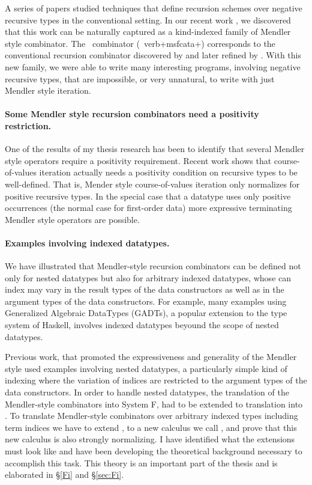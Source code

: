 A series of papers \cite{Pat93,MeiHut95,FegShe96,DesPfeSch97,bgb} studied 
techniques that define recursion schemes over negative recursive types
in the conventional setting. In our recent work \cite{AhnShe11}, we discovered
that this work can be naturally captured as a kind-indexed family of
Mendler style combinator. The \MIt\ combinator (\aka\ verb+msfcata+) corresponds
to the conventional recursion combinator discovered by \citet{FegShe96} and
later refined by \citet{bgb}. With this new family, we were able to write many
interesting programs, involving negative recursive types, that are impossible,
or very unnatural, to write with just Mendler style iteration.

\paragraph{Some Mendler style recursion combinators need
           a positivity restriction.}
One of the results of my thesis research has been to identify that several
Mendler style operators require a positivity requirement. 
Recent work \cite{AhnShe11} shows that course-of-values iteration
\cite{vene00phd,UusVen02} actually needs a positivity condition on
recursive types to be well-defined. That is, Mender style course-of-values
iteration only normalizes for positive recursive types. In the special case
that a datatype uses only positive occurrences (the normal case for first-order
data) more expressive terminating Mendler style operators are possible.

\paragraph{Examples involving indexed datatypes.} 
We \cite{AhnShe11} have illustrated that Mendler-style recursion combinators
can be defined not only for nested datatypes but also for arbitrary indexed
datatypes, whose can index may vary in the result types of the
data constructors as well as in the argument types of the data constructors.
For example, many examples using Generalized Algebraic DataTypes (GADTs),
a popular extension to the type system of Haskell, involves indexed datatypes
beyound the scope of nested datatypes.

Previous work, that promoted the expressiveness and generality of
the Mendler style \cite{AbeMatUus03,AbeMatUus05,AbeMat04} used examples
involving nested datatypes, a particularly simple kind of indexing
where the variation of indices are restricted to the argument types of
the data constructors. In order to handle nested datatypes, the translation of
the Mendler-style combinators into System \textsf{F}, had to be extended to
translation into \Fw. To translate Mendler-style combinators over arbitrary
indexed types including term indices we have to extend \Fw, to a new calculus
we call \Fi, and prove that this new calculus is also strongly normalizing.
I have identified what the extensions must look like and have been developing
the theoretical background necessary to accomplish this task.
This theory is an important part of the thesis and is elaborated in
\S\ref{Fi} and \S\ref{sec:Fi}.

